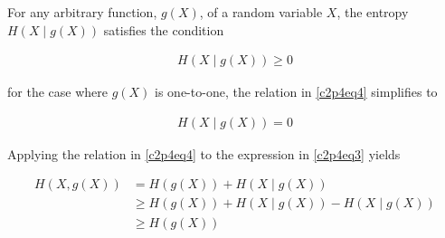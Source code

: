 \documentclass[ClusteringConnectionsMAIN.tex]{subfiles}
\begin{document}
	
	
  For any arbitrary function, $g \left( X \right)$, of a random variable $X$, the entropy $H \left( X \mid g \left( X \right)\right)$ satisfies the condition

\begin{align} \label{c2p4eq4}
H \left( X \mid g \left( X \right)\right) \geq 0  \tag{2.4-4}
\end{align}

for the case where $g \left( X \right)$ is one-to-one, the relation in \ref{c2p4eq4} simplifies to

\begin{align*}
H \left( X \mid g \left( X \right)\right) = 0
\end{align*}

Applying the relation in \ref{c2p4eq4} to the expression in \ref{c2p4eq3} yields

\begin{align*}
H \left( X, g \left( X \right) \right) &= H \left( g \left( X \right) \right) + H \left( X \mid g \left( X \right) \right) \\
&\geq H \left( g \left( X \right) \right) + H \left( X \mid g \left( X \right) \right) - H \left( X \mid g \left( X \right)\right) \\
&\geq H \left( g \left( X \right) \right)
\end{align*}
\end{document}
